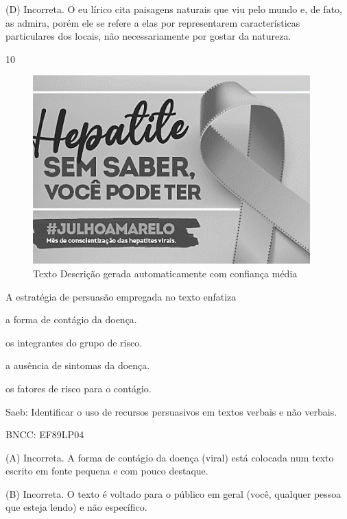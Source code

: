 (D) Incorreta. O eu lírico cita paisagens naturais que viu pelo mundo e,
de fato, as admira, porém ele se refere a elas por representarem
características particulares dos locais, não necessariamente por gostar
da natureza.

\num{10}

\begin{figure}
\centering
\includegraphics[width=4.21103in,height=2.86458in]{./imgSAEB_8_POR/media/image31.png}
\caption{Texto Descrição gerada automaticamente com confiança média}
\end{figure}


A estratégia de persuasão empregada no texto enfatiza

\begin{escolha}
\item
  a forma de contágio da doença.
\item
  os integrantes do grupo de risco.
\item
  a ausência de sintomas da doença.
\item
  os fatores de risco para o contágio.
\end{escolha}

Saeb: Identificar o uso de recursos persuasivos em textos verbais e não
verbais.

BNCC: EF89LP04

(A) Incorreta. A forma de contágio da doença (viral) está colocada num
texto escrito em fonte pequena e com pouco destaque.

(B) Incorreta. O texto é voltado para o público em geral (você, qualquer
pessoa que esteja lendo) e não específico.

